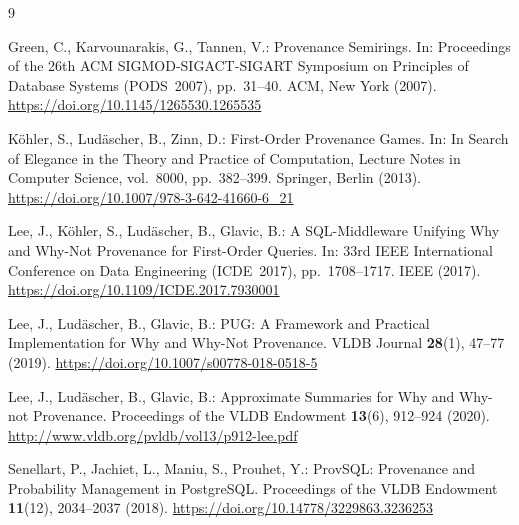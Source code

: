 \documentclass{llncs}
\begin{document}

\begin{thebibliography}{9}

Green, C., Karvounarakis, G., Tannen, V.:
Provenance Semirings.
In: Proceedings of the 26th ACM SIGMOD-SIGACT-SIGART Symposium on
Principles of Database Systems (PODS~2007), pp.~31--40.
ACM, New York (2007).
\url{https://doi.org/10.1145/1265530.1265535}

K\"{o}hler, S., Lud\"{a}scher, B., Zinn, D.:
First-Order Provenance Games.
In: In Search of Elegance in the Theory and Practice of Computation,
Lecture Notes in Computer Science, vol.~8000, pp.~382--399.
Springer, Berlin (2013).
\url{https://doi.org/10.1007/978-3-642-41660-6_21}

Lee, J., K\"{o}hler, S., Lud\"{a}scher, B., Glavic, B.:
A SQL-Middleware Unifying Why and Why-Not Provenance for First-Order
Queries.
In: 33rd IEEE International Conference on Data Engineering
(ICDE~2017), pp.~1708--1717. IEEE (2017).
\url{https://doi.org/10.1109/ICDE.2017.7930001}

Lee, J., Lud\"{a}scher, B., Glavic, B.:
PUG: A Framework and Practical Implementation for Why and Why-Not
Provenance.
VLDB Journal \textbf{28}(1), 47--77 (2019).
\url{https://doi.org/10.1007/s00778-018-0518-5}

Lee, J., Lud\"{a}scher, B., Glavic, B.:
Approximate Summaries for Why and Why-not Provenance.
Proceedings of the VLDB Endowment \textbf{13}(6), 912--924 (2020).
\url{http://www.vldb.org/pvldb/vol13/p912-lee.pdf}

Senellart, P., Jachiet, L., Maniu, S., Prouhet, Y.:
ProvSQL: Provenance and Probability Management in PostgreSQL.
Proceedings of the VLDB Endowment \textbf{11}(12), 2034--2037 (2018).
\url{https://doi.org/10.14778/3229863.3236253}

\end{thebibliography}
\end{document}
